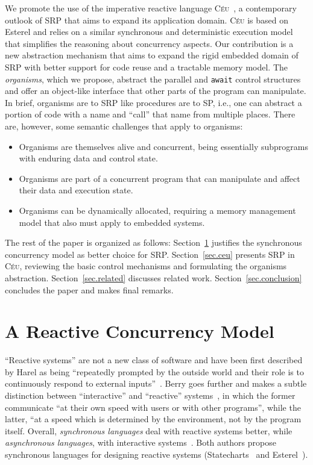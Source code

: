 \documentclass{acm_proc_article-sp}
\newcommand{\CEU}{\textsc{C\'{e}u}\xspace}
\newcommand{\code}[1] {{\small{\texttt{#1}}}}
\newcommand{\1}{\;}
\newcommand{\2}{\;\;}
\newcommand{\3}{\;\;\;}
\newcommand{\5}{\;\;\;\;\;}
\begin{document}
We promote the use of the imperative reactive language 
\CEU~\cite{ceu.sensys13}, a contemporary outlook of SRP that aims to expand its 
application domain.
%
\CEU is based on Esterel and relies on a similar synchronous and deterministic 
execution model that simplifies the reasoning about concurrency aspects.
%
Our contribution is a new abstraction mechanism that aims to expand the rigid 
embedded domain of SRP with better support for code reuse and a tractable 
memory model.
%
The \emph{organisms}, which we propose, abstract the parallel and \code{await} 
control structures and offer an object-like interface that other parts of the 
program can manipulate.
%
In brief, organisms are to SRP like procedures are to SP, i.e., one can 
abstract a portion of code with a name and ``call'' that name from multiple 
places.
%
There are, however, some semantic challenges that apply to organisms:
%
\begin{itemize}
\item Organisms are themselves alive and concurrent, being essentially 
subprograms with enduring data and control state.
\item Organisms are part of a concurrent program that can manipulate and affect 
their data and execution state.
\item Organisms can be dynamically allocated, requiring a memory management 
model that also must apply to embedded systems.
\end{itemize}

The rest of the paper is organized as follows:
Section~\ref{sec.models} justifies the synchronous concurrency model as better 
choice for SRP.
Section~\ref{sec.ceu} presents SRP in \CEU, reviewing the basic control 
mechanisms and formulating the organisms abstraction.
Section~\ref{sec.related} discusses related work.
Section~\ref{sec.conclusion} concludes the paper and makes final remarks.

\section{A Reactive Concurrency Model}
\label{sec.models}

``Reactive systems'' are not a new class of software and have been first 
described by Harel as being ``repeatedly prompted by the outside world and 
their role is to continuously respond to external 
inputs''~\cite{statecharts.reactive}.
%
Berry goes further and makes a subtle distinction between ``interactive'' and 
``reactive'' systems~\cite{rp.synchronous}, in which the former communicate 
``at their own speed with users or with other programs'', while the latter, 
``at a speed which is determined by the environment, not by the program itself.
%
Overall, \emph{synchronous languages} deal with reactive systems better, while 
\emph{asynchronous languages}, with interactive systems~\cite{esterel.crp}.
%
Both authors propose synchronous languages for designing reactive systems 
(Statecharts~\cite{statecharts.visual} and Esterel~\cite{esterel.ieee91}).
\end{document}
